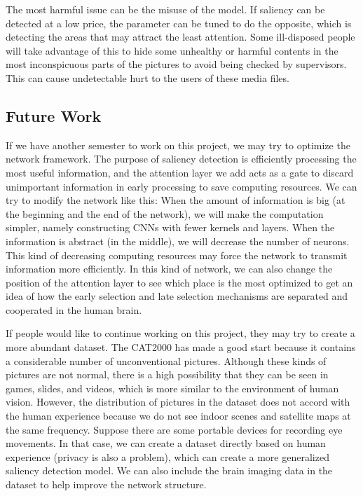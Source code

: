 \documentclass[12pt]{article}
\begin{document}
The most harmful issue can be the misuse of the model. 
If saliency can be detected at a low price, the parameter can be tuned to do the opposite, 
which is detecting the areas that may attract the least attention. 
Some ill-disposed people will take advantage of this to hide some unhealthy or harmful contents in the most inconspicuous parts of the pictures to avoid being checked by supervisors. 
This can cause undetectable hurt to the users of these media files.

\subsection{Future Work}

If we have another semester to work on this project, we may try to optimize the network framework.
The purpose of saliency detection is efficiently processing the most useful information, and the attention layer we add acts as a gate to discard unimportant information in early processing to save computing resources.
We can try to modify the network like this: When the amount of information is big (at the beginning and the end of the network), we will make the computation simpler, namely constructing CNNs with fewer kernels and layers.
When the information is abstract (in the middle), we will decrease the number of neurons.
This kind of decreasing computing resources may force the network to transmit information more efficiently.
In this kind of network, we can also change the position of the attention layer to see which place is the most optimized to get an idea of how the early selection and late selection mechanisms are separated and cooperated in the human brain.

If people would like to continue working on this project, they may try to create a more abundant dataset. The CAT2000 has made a good start because it contains a considerable number of unconventional pictures.
Although these kinds of pictures are not normal, there is a high possibility that they can be seen in games, slides, and videos, which is more similar to the environment of human vision.
However, the distribution of pictures in the dataset does not accord with the human experience because we do not see indoor scenes and satellite maps at the same frequency.
Suppose there are some portable devices for recording eye movements. In that case, we can create a dataset directly based on human experience (privacy is also a problem), which can create a more generalized saliency detection model.
We can also include the brain imaging data in the dataset to help improve the network structure.
\end{document}
